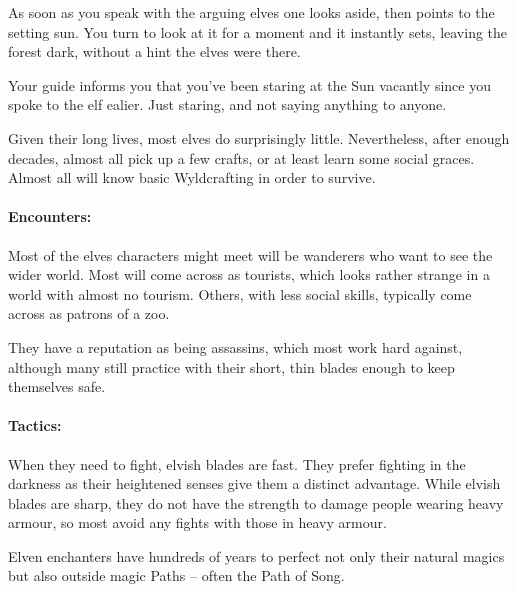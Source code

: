 \begin{multicols}{2}
\begin{boxtext}

  As soon as you speak with the arguing elves one looks aside, then points to the setting sun.
  You turn to look at it for a moment and it instantly sets, leaving the forest dark, without a hint the elves were there.

  Your guide informs you that you've been staring at the Sun vacantly since you spoke to the elf ealier.
  Just staring, and not saying anything to anyone.

\end{boxtext}

\label{elf}

Given their long lives, most elves do surprisingly little.
Nevertheless, after enough decades, almost all pick up a few crafts, or at least learn some social graces.
Almost all will know basic Wyldcrafting in order to survive.

\paragraph{Encounters:}
Most of the elves characters might meet will be wanderers who want to see the wider world.
Most will come across as tourists, which looks rather strange in a world with almost no tourism.
Others, with less social skills, typically come across as patrons of a zoo.

They have a reputation as being assassins, which most work hard against, although many still practice with their short, thin blades enough to keep themselves safe.

\paragraph{Tactics:} When they need to fight, elvish blades are fast.
They prefer fighting in the darkness as their heightened senses give them a distinct advantage.
While elvish blades are sharp, they do not have the strength to damage people wearing heavy armour, so most avoid any fights with those in heavy armour.


\label{elven_enchanter}

Elven enchanters have hundreds of years to perfect not only their natural magics but also outside magic Paths -- often the Path of Song.



\end{multicols}
